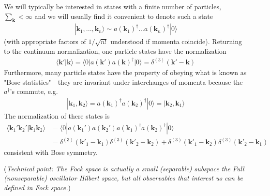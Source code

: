 \documentclass{article}
\begin{document}
We will typically be interested in states with a finite number of particles, $\sum_\mathbf{k}<\infty$ and we will usually find it convenient to denote such a state
\begin{align}
|\mathbf{k}_1,...,\mathbf{k}_n\rangle\sim a(\mathbf{k}_1)^\dagger ...  a(\mathbf{k}_n)^\dagger|0\rangle
\end{align}
(with appropriate factors of $1/\sqrt{n!}$ understood if momenta coincide). Returning to the continuum normalization, one particle states have the normalization
\begin{align}
\langle\mathbf{k}'|\mathbf{k}\rangle
=\langle0|a(\mathbf{k}')a(\mathbf{k})^\dagger|0\rangle=\delta^{(3)}(\mathbf{k}'-\mathbf{k})
\end{align}
Furthermore, many particle states have the property of obeying what is known as "Bose statistics" - they are invariant under interchanges of momenta because the $a^\dagger$'s commute, e.g.
\begin{align}
|\mathbf{k}_1,\mathbf{k}_2\rangle=a(\mathbf{k}_1)^\dagger a(\mathbf{k}_2)^\dagger|0\rangle=|\mathbf{k}_2,\mathbf{k}_1\rangle
\end{align} 
The normalization of there states is
\begin{align}
\langle\mathbf{k}_1'\mathbf{k}_2'|\mathbf{k}_1\mathbf{k}_2\rangle
&=\langle0|a(\mathbf{k}_1')a(\mathbf{k}_2')a(\mathbf{k}_1)^\dagger a(\mathbf{k}_2)^\dagger|0\rangle\\
&=\delta^{(3)}(\mathbf{k}'_1-\mathbf{k}_1)\delta^{(3)}(\mathbf{k}'_2-\mathbf{k}_2)
+\delta^{(3)}(\mathbf{k}'_1-\mathbf{k}_2)\delta^{(3)}(\mathbf{k}'_2-\mathbf{k}_1)
\end{align}
consistent with Bose symmetry.

({\it Technical point: The Fock space is actually a small (separable) subspace the Full (nonseparable) oscillator Hilbert space, but all observables that interest us can be defined in Fock space.})

\end{document}
